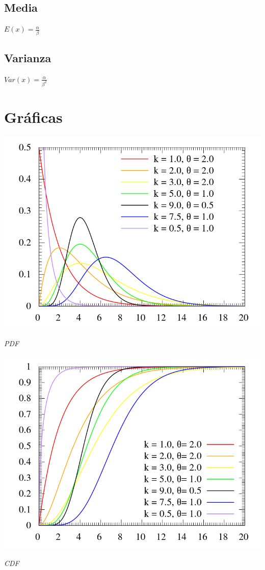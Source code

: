 \subsection{Media}
\begin{center}
	$E(x) = \frac{\alpha}{\beta}$
\end{center}

\subsection{Varianza}
\begin{center}
	$Var(x) = \frac{\alpha}{\beta^2}$
\end{center}

\section{Gráficas}

\begin{center}
	\includegraphics[scale=0.5]{imgs/gamma-pdf.png}
	
	\textit{PDF}
\end{center}

\begin{center}
	\includegraphics[scale=0.5]{imgs/gamma-cdf.png}
	
	\textit{CDF}
\end{center}

